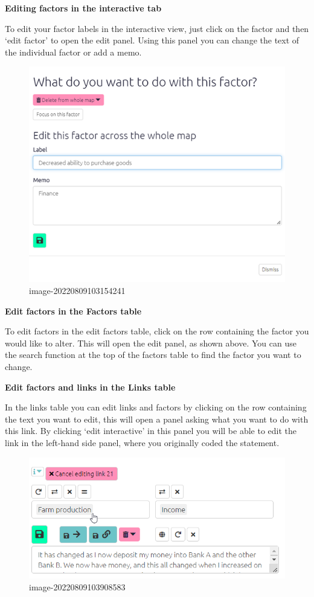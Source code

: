 \documentclass[
]{book}
\begin{document}
\textbf{Editing factors in the interactive tab}

To edit your factor labels in the interactive view, just click on the factor and then `edit factor' to open the edit panel. Using this panel you can change the text of the individual factor or add a memo.

\begin{figure}
\centering
\includegraphics[width=6.77083in,height=\textheight]{_assets/image-20220809103154241.png}
\caption{image-20220809103154241}
\end{figure}

\textbf{Edit factors in the Factors table}

To edit factors in the edit factors table, click on the row containing the factor you would like to alter. This will open the edit panel, as shown above. You can use the search function at the top of the factors table to find the factor you want to change.

\textbf{Edit factors and links in the Links table}

In the links table you can edit links and factors by clicking on the row containing the text you want to edit, this will open a panel asking what you want to do with this link. By clicking `edit interactive' in this panel you will be able to edit the link in the left-hand side panel, where you originally coded the statement.

\begin{figure}
\centering
\includegraphics[width=6.77083in,height=\textheight]{_assets/image-20220809103908583.png}
\caption{image-20220809103908583}
\end{figure}
\end{document}
